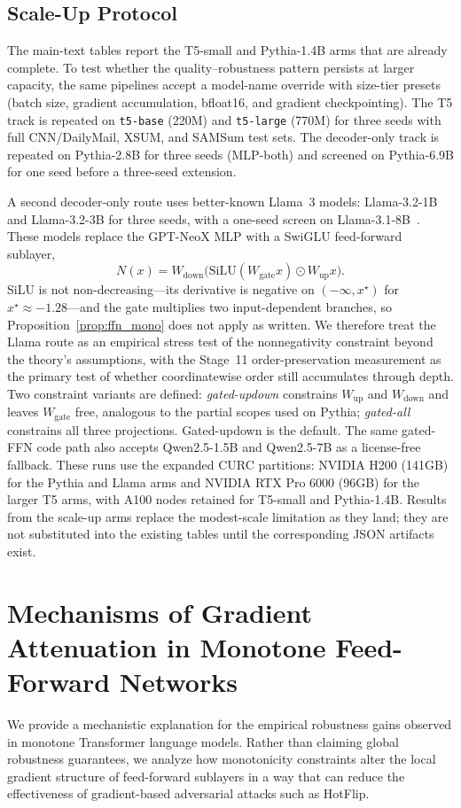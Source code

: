 \documentclass{article}
\theoremstyle{plain}
\theoremstyle{definition}
\theoremstyle{remark}
\begin{document}
\subsection{Scale-Up Protocol}
\label{sec:scale-protocol}
The main-text tables report the T5-small and Pythia-1.4B arms that are already complete. To test whether the quality--robustness pattern persists at larger capacity, the same pipelines accept a model-name override with size-tier presets (batch size, gradient accumulation, bfloat16, and gradient checkpointing). The T5 track is repeated on \texttt{t5-base} (220M) and \texttt{t5-large} (770M) for three seeds with full CNN/DailyMail, XSUM, and SAMSum test sets. The decoder-only track is repeated on Pythia-2.8B for three seeds (MLP-both) and screened on Pythia-6.9B for one seed before a three-seed extension.

A second decoder-only route uses better-known Llama~3 models: Llama-3.2-1B and Llama-3.2-3B for three seeds, with a one-seed screen on Llama-3.1-8B~\cite{grattafiori2024llama}. These models replace the GPT-NeoX MLP with a SwiGLU feed-forward sublayer,
\[
N(x) = W_{\mathrm{down}}\bigl(\mathrm{SiLU}(W_{\mathrm{gate}}x)\odot W_{\mathrm{up}}x\bigr).
\]
SiLU is not non-decreasing---its derivative is negative on $(-\infty, x^\star)$ for $x^\star\approx -1.28$---and the gate multiplies two input-dependent branches, so Proposition~\ref{prop:ffn_mono} does not apply as written. We therefore treat the Llama route as an empirical stress test of the nonnegativity constraint beyond the theory's assumptions, with the Stage~11 order-preservation measurement as the primary test of whether coordinatewise order still accumulates through depth. Two constraint variants are defined: \emph{gated-updown} constrains $W_{\mathrm{up}}$ and $W_{\mathrm{down}}$ and leaves $W_{\mathrm{gate}}$ free, analogous to the partial scopes used on Pythia; \emph{gated-all} constrains all three projections. Gated-updown is the default. The same gated-FFN code path also accepts Qwen2.5-1.5B and Qwen2.5-7B as a license-free fallback. These runs use the expanded CURC partitions: NVIDIA H200 (141GB) for the Pythia and Llama arms and NVIDIA RTX Pro 6000 (96GB) for the larger T5 arms, with A100 nodes retained for T5-small and Pythia-1.4B. Results from the scale-up arms replace the modest-scale limitation as they land; they are not substituted into the existing tables until the corresponding JSON artifacts exist.

\section{Mechanisms of Gradient Attenuation in Monotone Feed-Forward Networks}
\label{sec:gradient-attenuation}
We provide a mechanistic explanation for the empirical robustness gains observed in monotone Transformer language models. Rather than claiming global robustness guarantees, we analyze how monotonicity constraints alter the local gradient structure of feed-forward sublayers in a way that can reduce the effectiveness of gradient-based adversarial attacks such as HotFlip.
\end{document}
